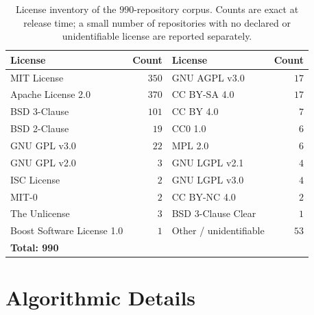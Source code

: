 \begin{table}[h]
\centering
\caption{License inventory of the $990$-repository corpus. Counts are
exact at release time; a small number of repositories with no declared
or unidentifiable license are reported separately.}
\label{tab:licenses}
\small
\setlength{\tabcolsep}{6pt}
\begin{tabular}{lr|lr}
\toprule
License & Count & License & Count \\
\midrule
MIT License                                     & $350$ & GNU AGPL v3.0                                  & $17$ \\
Apache License 2.0                              & $370$ & CC BY-SA 4.0                                   & $17$ \\
BSD 3-Clause                                    & $101$ & CC BY 4.0                                      & $7$  \\
BSD 2-Clause                                    & $19$  & CC0 1.0                                        & $6$  \\
GNU GPL v3.0                                    & $22$  & MPL 2.0                                        & $6$  \\
GNU GPL v2.0                                    & $3$   & GNU LGPL v2.1                                  & $4$  \\
ISC License                                     & $2$   & GNU LGPL v3.0                                  & $4$  \\
MIT-0                                           & $2$   & CC BY-NC 4.0                                   & $2$  \\
The Unlicense                                   & $3$   & BSD 3-Clause Clear                             & $1$  \\
Boost Software License 1.0                      & $1$   & Other / unidentifiable                         & $53$ \\
\midrule
\multicolumn{4}{l}{\textbf{Total: 990}} \\
\bottomrule
\end{tabular}
\end{table}

\section{Algorithmic Details}
\label{app:algo}

